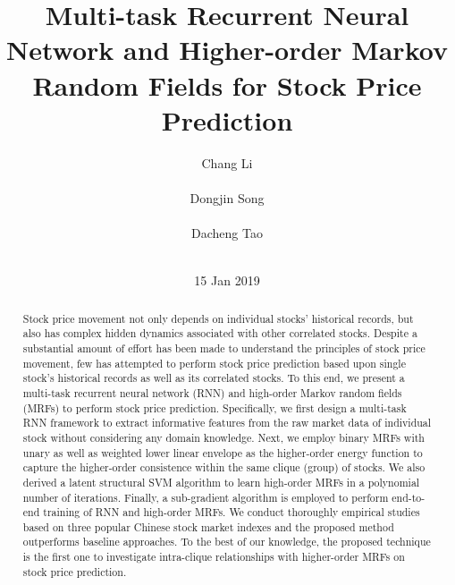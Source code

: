 \documentclass[sigconf,anonymous,review]{acmart}
\begin{document}
\title[RNN Higer-order MRFs for stock price prediction]{Multi-task Recurrent Neural Network and
  Higher-order Markov Random Fields for Stock Price
  Prediction}


\author{
\alignauthor Chang Li \\
       \\
\alignauthor Dongjin Song \\
       \\
\alignauthor Dacheng Tao\\
       \\
}
\date{15 Jan 2019}


\begin{abstract}
  Stock price movement not only depends on individual stocks'
  historical records, but also has complex hidden dynamics associated with other correlated stocks. Despite a substantial amount of effort has been made to understand the principles of stock price movement, few has attempted to perform stock price prediction based upon
  single stock's historical records as well as its correlated stocks. To this end, we present a multi-task recurrent neural network (RNN) and high-order Markov random fields (MRFs) to perform stock price prediction. Specifically, we first design a multi-task RNN framework to extract informative features from the raw market data of individual stock without considering any domain knowledge. Next, we employ binary MRFs with
  unary as well as weighted lower linear envelope as the higher-order energy
  function to capture the higher-order consistence within the same clique (group) of stocks. We also derived a latent structural SVM algorithm to learn high-order MRFs in a
  polynomial number of iterations. Finally, a sub-gradient
  algorithm is employed to perform end-to-end training of RNN and
  high-order MRFs. We conduct thoroughly empirical studies based on three popular Chinese
  stock market indexes and the proposed method outperforms baseline approaches. To the best of our knowledge, the proposed technique is the first one to
  investigate intra-clique relationships with higher-order MRFs on stock price prediction.
\end{abstract}

\end{document}
